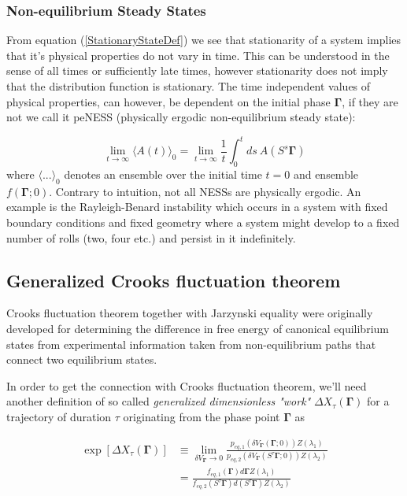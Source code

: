 \documentclass[a4paper,12pt]{article}
\begin{document}
\subsubsection{Non-equilibrium Steady States}

From equation (\ref{StationaryStateDef}) we see that stationarity of a system implies that it's physical properties do not vary in time. This can be understood in the sense of all times or sufficiently late times, however stationarity does not imply that the distribution function is stationary.
The time independent values of physical properties, can however, be dependent on the initial phase $\bm{\Gamma}$, if they are not we call it peNESS (physically ergodic non-equilibrium steady state):

\begin{equation}
      \lim_{t \to \infty} \langle A(t) \rangle_0 = \lim_{t \to \infty} \frac{1}{t} \int_0^t ds\ A(S^s \bm{\Gamma})
\end{equation}
 where $\langle ... \rangle_0$ denotes an ensemble over the initial time $t=0$ and ensemble $f(\bm{\Gamma};0)$.
Contrary to intuition, not all NESSs are physically ergodic. An example is the Rayleigh-Benard instability which occurs in a system with fixed boundary conditions and fixed geometry where a system might develop to a fixed number of rolls (two, four etc.) and persist in it indefinitely.
\subsection{Generalized Crooks fluctuation theorem}

Crooks fluctuation theorem together with Jarzynski equality were originally developed for determining the difference in free energy of canonical equilibrium states from experimental information taken from non-equilibrium paths that connect two equilibrium states. 

In order to get the connection with Crooks fluctuation theorem, we'll need another definition of so called \textit{generalized dimensionless "work"} $\Delta X_{\tau}(\bm{\Gamma})$ for a trajectory of duration $\tau$ originating from the phase point $\bm{\Gamma}$ as

\begin{equation}
\begin{aligned}
\label{GeneralizedWorkDef}
  \exp[\Delta X_{\tau}(\bm{\Gamma})] &\equiv \lim_{\delta V_{\bm{\Gamma}} \to 0} \frac{p_{eq,1} (\delta V_{\bm{\Gamma}}(\bm{\Gamma};0))Z(\lambda_1)}{p_{eq,2} (\delta V_{\bm{\Gamma}}(S^{\tau}\bm{\Gamma};0))Z(\lambda_2)} \\
  &= \frac{f_{eq,1}(\bm{\Gamma}) d\bm{\Gamma} Z(\lambda_1)}{f_{eq,2}(S^{\tau}\bm{\Gamma}) d(S^{\tau}\bm{\Gamma}) Z(\lambda_2)}
\end{aligned}
\end{equation}
\end{document}

